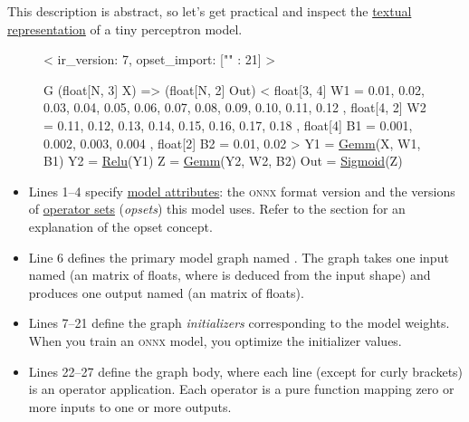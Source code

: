 \documentclass{article}
\begin{document}
This description is abstract, so let's get practical and inspect the \href{https://onnx.ai/onnx/repo-docs/Syntax.html}{textual representation} of a tiny perceptron model.

\begin{figure}
\begin{code}[linenumbers]
<
    ir_version: 7,
    opset_import: ["" : 21]
>

G (float[N, 3] X) => (float[N, 2] Out)
<
    float[3, 4] W1 = {
        0.01, 0.02, 0.03, 0.04,
        0.05, 0.06, 0.07, 0.08,
        0.09, 0.10, 0.11, 0.12
    },
    float[4, 2] W2 = {
        0.11, 0.12,
        0.13, 0.14,
        0.15, 0.16,
        0.17, 0.18
    },
    float[4] B1 = { 0.001, 0.002, 0.003, 0.004 },
    float[2] B2 = { 0.01, 0.02 }
>
{
    Y1 = \href{https://onnx.ai/onnx/operators/onnx__Gemm.html}{Gemm}(X, W1, B1)
    Y2 = \href{https://onnx.ai/onnx/operators/onnx__Relu.html}{Relu}(Y1)
    Z = \href{https://onnx.ai/onnx/operators/onnx__Gemm.html}{Gemm}(Y2, W2, B2)
    Out = \href{https://onnx.ai/onnx/operators/onnx__Sigmoid.html}{Sigmoid}(Z)
}
\end{code}
\end{figure}

\begin{itemize}
\item
    Lines 1--4 specify \href{https://onnx.ai/onnx/repo-docs/IR.html#models}{model attributes}:
    the \textsc{onnx} format version and the versions of \href{https://onnx.ai/onnx/repo-docs/IR.html#operator-sets}{operator sets} (\emph{opsets}) this model uses.
    Refer to the  section for an explanation of the opset concept.
\item
    Line 6 defines the primary model graph named .
    The graph takes one input named  (an  matrix of floats, where  is deduced from the input shape)
    and produces one output named  (an  matrix of floats).
\item
    Lines 7--21 define the graph \emph{initializers} corresponding to the model weights.
    When you train an \textsc{onnx} model, you optimize the initializer values.
\item
    Lines 22--27 define the graph body, where each line (except for curly brackets) is an operator application.
    Each operator is a pure function mapping zero or more inputs to one or more outputs.
\end{itemize}
\end{document}
